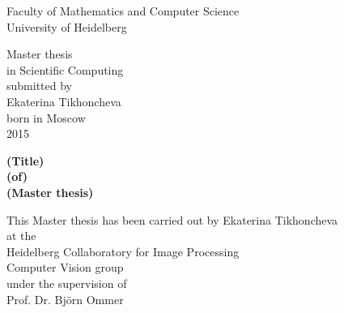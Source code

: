 \version
\thispagestyle{empty}
\begin{center}
  \renewcommand{\baselinestretch}{2.00}
  \Large\sffamily
  Faculty of Mathematics and Computer Science\\
  \large University of Heidelberg
  \par\vfill\normalfont
  Master thesis\\
  in Scientific Computing\\
  submitted by\\
  Ekaterina Tikhoncheva\\
  born in Moscow\\
  2015
\end{center}
\newpage

\thispagestyle{empty}
\begin{center}
  \renewcommand{\baselinestretch}{2.00}
  \Large\bfseries\sffamily
    (Title)\\
    (of)\\
    (Master thesis)
  \par
  \vfill
  \large\normalfont
  This Master thesis has been carried out by Ekaterina Tikhoncheva\\
  at the\\
  Heidelberg Collaboratory for Image Processing\\
  Computer Vision group\\
  under the supervision of\\
  Prof. Dr. Björn Ommer
\end{center}\par
\vspace{5\baselineskip}

\renewcommand{\baselinestretch}{1.00}\normalsize